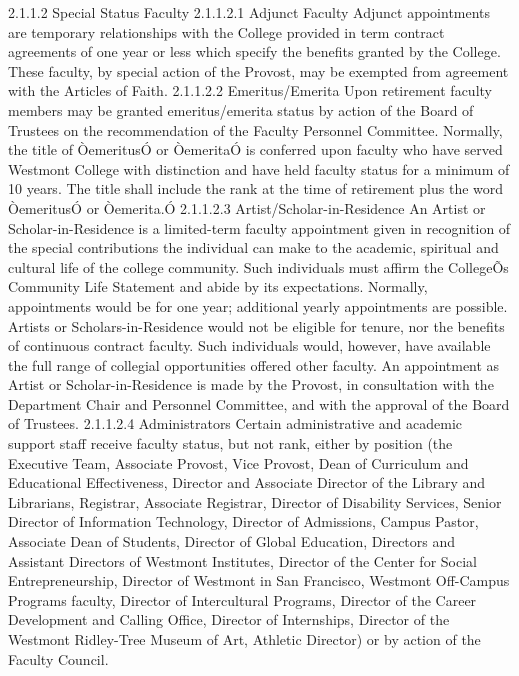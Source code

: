 \documentclass[letterpaper, 11pt]{article}
\begin{document}
2.1.1.2 Special Status Faculty
2.1.1.2.1 Adjunct Faculty
   Adjunct appointments are temporary relationships with the College provided in term contract agreements of one year or less which specify the benefits granted by the College. These faculty, by special action of the Provost, may be exempted from agreement with the Articles of Faith.
2.1.1.2.2 Emeritus/Emerita
   Upon retirement faculty members may be granted emeritus/emerita status by action of the Board of Trustees on the recommendation of the Faculty Personnel Committee.  Normally, the title of ÒemeritusÓ or ÒemeritaÓ is conferred upon faculty who have served Westmont College with distinction and have held faculty status for a minimum of 10 years.  The title shall include the rank at the time of retirement plus the word ÒemeritusÓ or Òemerita.Ó
2.1.1.2.3 Artist/Scholar-in-Residence
   An Artist or Scholar-in-Residence is a limited-term faculty appointment given in recognition of the special contributions the individual can make to the academic, spiritual and cultural life of the college community.  Such individuals must affirm the CollegeÕs Community Life Statement and abide by its expectations.  Normally, appointments would be for one year; additional yearly appointments are possible.  Artists or Scholars-in-Residence would not be eligible for tenure, nor the benefits of continuous contract faculty. Such individuals would, however, have available the full range of collegial opportunities offered other faculty.  An appointment as Artist or Scholar-in-Residence is made by the Provost, in consultation with the Department Chair and Personnel Committee, and with the approval of the Board of Trustees.
2.1.1.2.4 Administrators
   Certain administrative and academic support staff receive faculty status, but not rank, either by position (the Executive Team, Associate Provost, Vice Provost, Dean of Curriculum and Educational Effectiveness, Director and Associate Director of the Library and Librarians, Registrar, Associate Registrar, Director of Disability Services, Senior Director of Information Technology, Director of Admissions, Campus Pastor, Associate Dean of Students, Director of Global Education, Directors and Assistant Directors of Westmont Institutes, Director of the Center for Social Entrepreneurship, Director of Westmont in San Francisco, Westmont Off-Campus Programs faculty, Director of Intercultural Programs, Director of the Career Development and Calling Office, Director of Internships, Director of the Westmont Ridley-Tree Museum of Art, Athletic Director) or by action of the Faculty Council.
\end{document}
